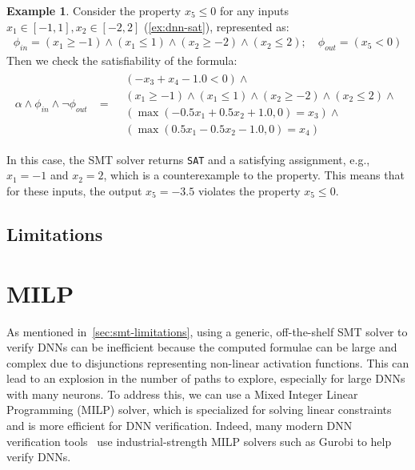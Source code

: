 \documentclass[oneside,11pt,dvipsnames]{book}
\numberwithin{equation}{section}
\theoremstyle{definition}
\newtheorem{example}{Example}[section]
\theoremstyle{remark}
\newcommand{\sat}{\texttt{SAT}}
\begin{document}
\begin{example}\label{ex:smt-dnn}
    Consider the property $x_5 \le 0$ for any inputs $x_1 \in [-1,1], x_2\in[-2,2]$ (\autoref{ex:dnn-sat}), represented as:
\begin{align*}
\phi_{in} = (x_1 \ge -1) \land (x_1 \le 1) \land (x_2 \ge -2) \land (x_2 \le 2); \quad \phi_{out} = (x_5 < 0)
\end{align*}
Then we check the satisfiability of the formula:
\begin{align*}
\alpha \land \phi_{in} \land \neg \phi_{out} &=
\begin{split}
    &(-x_3 + x_4 - 1.0 < 0) \land \\
    &(x_1 \ge -1) \land (x_1 \le 1) \land (x_2 \ge -2) \land (x_2 \le 2) \land \\
    &(\max(-0.5x_1 + 0.5x_2 + 1.0, 0) = x_3) \land \\
    &(\max(0.5x_1 - 0.5x_2 - 1.0, 0) = x_4)
\end{split}
\end{align*}    

In this case, the SMT solver returns \sat{} and a satisfying assignment, e.g., $x_1=-1$ and $x_2=2$, which is a counterexample to the property. This means that for these inputs, the output $x_5 = -3.5$ violates the property $x_5 \le 0$.

\end{example}


\subsection{Limitations}\label{sec:smt-limitations} 
\section{MILP}

As mentioned in~\autoref{sec:smt-limitations}, using a generic, off-the-shelf SMT solver to verify DNNs can be inefficient because the computed formulae can be large and complex due to disjunctions representing non-linear activation functions.  This can lead to an explosion in the number of paths to explore, especially for large DNNs with many neurons.
To address this, we can use a Mixed Integer Linear Programming (MILP) solver, which is specialized for solving linear constraints and is more efficient for DNN verification. Indeed, many modern DNN verification tools~\cite{wang2018efficient,katz2017reluplex,henriksen2020efficient} use industrial-strength MILP solvers such as Gurobi to help verify DNNs.
\end{document}
